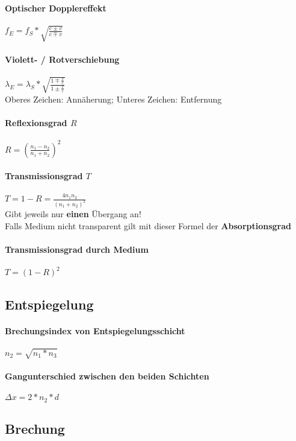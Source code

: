 \documentclass[12pt, a4paper]{scrreprt}
\begin{document}
\paragraph{Optischer Dopplereffekt} \dotfill \(f_E = f_S* \sqrt{\frac{c \pm v}{c \mp v}}\)
\paragraph{Violett- / Rotverschiebung} \dotfill \(\lambda_E = \lambda_S*\sqrt{\frac{1 \mp \frac{v}{c}}{1 \pm \frac{v}{c}}}\)\\
\myhspace{} \textcolor{myred}{Oberes Zeichen: Annäherung; Unteres Zeichen: Entfernung}
\paragraph{Reflexionsgrad \(R\)} \dotfill \(R = {\left( \frac{n_1 - n_2}{n_1 + n_2} \right)}^2\)
\paragraph{Transmissionsgrad \(T\)} \dotfill \(T = 1 - R = \frac{4 n_1 n_2}{{(n_1 + n_2)}^2}\)\\
\myhspace{} Gibt jeweils nur \textbf{einen} Übergang an!\\
\myhspace{} Falls Medium nicht transparent gilt mit dieser Formel der \textbf{Absorptionsgrad}
\paragraph{Transmissionsgrad \textbf{durch} Medium} \dotfill \(T = {(1 - R)}^2\)


\subsection{Entspiegelung}

\paragraph{Brechungsindex von Entspiegelungsschicht} \dotfill \(n_2 = \sqrt{n_1 * n_3}\)
\paragraph{Gangunterschied zwischen den beiden Schichten} \dotfill \(\Delta x = 2 * n_2 * d\)


\subsection{Brechung}
\end{document}
